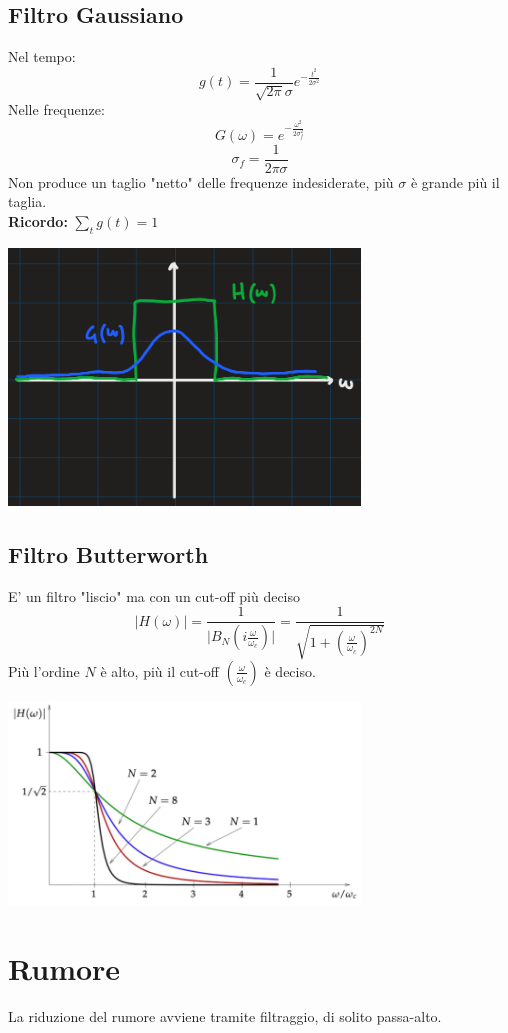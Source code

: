 \documentclass[12pt, a4paper]{report}
\begin{document}
\subsection{Filtro Gaussiano}
Nel tempo:
\begin{equation*}
    g(t)=\frac{1}{\sqrt{2\pi}\sigma}e^{-\frac{t^{2}}{2\sigma^{2}}}
\end{equation*}
Nelle frequenze:
\begin{equation*}
    G(\omega)=e^{-\frac{\omega^{2}}{2\sigma^{2}_{f}}}
\end{equation*}
\begin{equation*}
    \sigma_{f}=\frac{1}{2\pi\sigma}
\end{equation*}
Non produce un taglio "netto" delle frequenze indesiderate, più $\sigma$ è grande più il taglia.\\
\textbf{Ricordo:} $\sum_{t}g(t)=1$
\begin{center}
    \includegraphics[width=0.7\textwidth]{Immagini/filtrogaussiano.png}
\end{center}
\subsection{Filtro Butterworth}
E' un filtro "liscio" ma con un cut-off più deciso
\begin{equation*}
    \lvert H(\omega) \rvert = \frac{1}{\lvert  B_{N}(i\frac{\omega}{\omega_{c}}) \rvert} = \frac{1}{\sqrt{1+\left(\frac{\omega}{\omega_{c}}\right)^{2N}}}
\end{equation*}
Più l'ordine $N$ è alto, più il cut-off $\left(\frac{\omega}{\omega_{c}}\right)$ è deciso.
\begin{center}
    \includegraphics[width=0.7\textwidth]{Immagini/filtroButterworth.png}
\end{center}
\section{Rumore}
La riduzione del rumore avviene tramite filtraggio, di solito passa-alto.
\end{document}

